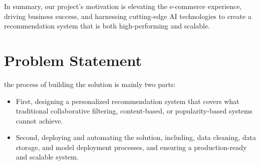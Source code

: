 In summary, our project's motivation is elevating the e-commerce experience, driving business success, and harnessing cutting-edge AI technologies to create a recommendation system that is both high-performing and scalable.

\section{Problem Statement}

the process of building the solution is mainly two parts:

\begin{itemize}
    \item First, designing a personalized recommendation system that covers what traditional collaborative filtering, content-based, or popularity-based systems cannot achieve.
    \item Second, deploying and automating the solution, including, data cleaning, data storage, and model deployment processes, and ensuring a production-ready and scalable system.
\end{itemize}





